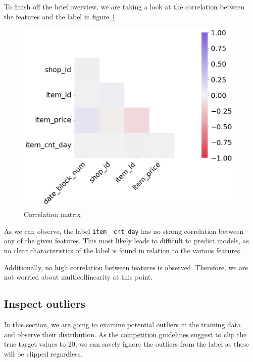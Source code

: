 To finish off the brief overview, we are taking a look at the correlation between the features and the label in figure \ref{corr_matrix}.

\begin{figure}
\centering
  \includegraphics[width=0.85\linewidth]{external_content/graphs/corr_matrix.png}
\captionsetup{justification=centering}
\caption{Correlation matrix}
\label{corr_matrix}
\end{figure}

\vspace*{6mm}
\noindent As we can observe, the label \texttt{item\_ cnt\_day} has no strong correlation between any of the given features. 
This most likely leads to difficult to predict models, as no clear characteristics of the label is found in relation to the various features.

\noindent Additionally, no high correlation between features is observed. Therefore, we are not worried about multicollinearity at this point. \cite{MultivariateStatistics}

\subsection{Inspect outliers}\label{sec:outliers}

In this section, we are going to examine potential outliers in the training data and observe their distribution. As the \href{https://www.kaggle.com/c/competitive-data-science-predict-future-sales/overview/evaluation}{competition guidelines} suggest to clip the true target values to 20, we can savely ignore the outliers from the label as these will be clipped regardless.

